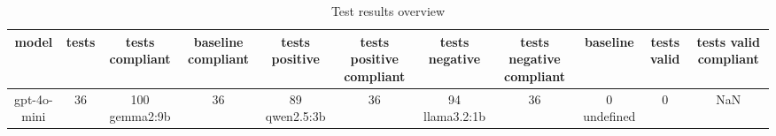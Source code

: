 
  \begin{table}[h!]
  \centering
  \begin{tabular}{|c|c|c|c|c|c|c|c|c|c|c|}
  \hline
  model & tests & tests compliant & baseline compliant & tests positive & tests positive compliant & tests negative & tests negative compliant & baseline & tests valid & tests valid compliant \\
  \hline
  gpt-4o-mini & 36 & 100%
\hline
gemma2:9b & 36 & 89%
\hline
qwen2.5:3b & 36 & 94%
\hline
llama3.2:1b & 36 & 0%
\hline
undefined & 0 & NaN%
  \end{tabular}
  \caption{Test results overview}
  
  \end{table}
  